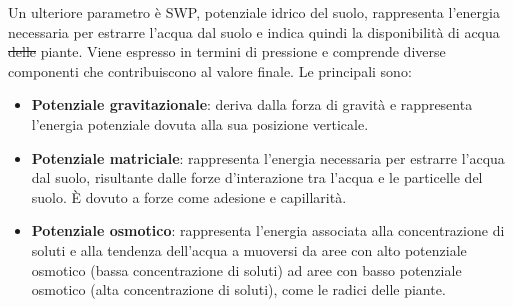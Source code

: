 \documentclass[12pt,a4paper,openright,twoside, openany]{book} %
\providecommand{\DIFadd}[1]{{\protect\color{blue}\uwave{#1}}} %
\providecommand{\DIFdel}[1]{{\protect\color{red}\sout{#1}}}                      %
\providecommand{\DIFaddbegin}{} %
\providecommand{\DIFaddend}{} %
\providecommand{\DIFdelbegin}{} %
\providecommand{\DIFdelend}{} %
\begin{document}
Un ulteriore parametro è \ac{SWP}, potenziale idrico del suolo, rappresenta l'energia necessaria per estrarre l'acqua dal suolo e indica quindi la disponibilità di acqua \DIFdelbegin \DIFdel{delle }\DIFdelend \DIFaddbegin \DIFadd{alle }\DIFaddend piante. Viene espresso in termini di pressione e comprende diverse componenti che contribuiscono al valore finale\cite{MarshallT.J.TheoJohn1996Sp}. Le principali sono:

\begin{itemize}[noitemsep]
    \item \textbf{Potenziale gravitazionale}: deriva dalla forza di gravità e rappresenta l'energia potenziale dovuta alla sua posizione verticale.
    \item \textbf{Potenziale matriciale}: rappresenta l'energia necessaria per estrarre l'acqua dal suolo, risultante dalle forze d'interazione tra l'acqua e le particelle del suolo. È dovuto a forze come adesione e capillarità.
    \item \textbf{Potenziale osmotico}: rappresenta l'energia associata alla concentrazione di soluti e alla tendenza dell'acqua a muoversi da aree con alto potenziale osmotico (bassa concentrazione di soluti) ad aree con basso potenziale osmotico (alta concentrazione di soluti), come le radici delle piante.
\end{itemize}
\end{document}
